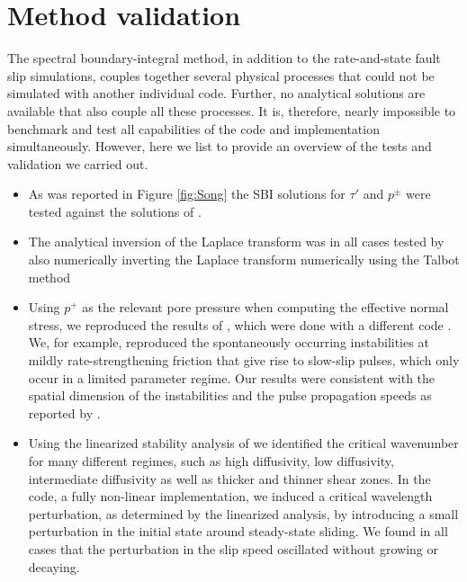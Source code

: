 \documentclass[draft]{agujournal2019}
\begin{document}
\section{Method validation}

The spectral boundary-integral method, in addition to the rate-and-state fault slip simulations, couples together several physical processes that could not be simulated with another individual code. Further, no analytical solutions are available that also couple all these processes. It is, therefore, nearly impossible to benchmark and test all capabilities of the code and implementation simultaneously. However, here we list to provide an overview of the tests and validation we carried out.

\begin{itemize}
    \item As was reported in Figure \ref{fig:Song} the SBI solutions for $\tau'$ and $p^\pm$ were tested against the solutions of \cite{Song2017}.
    \item The analytical inversion of the Laplace transform was in all cases tested by also numerically inverting the Laplace transform numerically using the Talbot method \cite{Talbot1979}
    \item Using $p^+$ as the relevant pore pressure when computing the effective normal stress, we reproduced the results of \cite{Heimisson2019}, which were done with a different code \cite{Torberntsson2018}. We, for example, reproduced the spontaneously occurring instabilities at mildly rate-strengthening friction that give rise to slow-slip pulses, which only occur in a limited parameter regime. Our results were consistent with the spatial dimension of the instabilities and the pulse propagation speeds as reported by \cite{Heimisson2019}.
    \item Using the linearized stability analysis of \cite{Heimisson2021} we identified the critical wavenumber for many different regimes, such as high diffusivity, low diffusivity, intermediate diffusivity as well as thicker and thinner shear zones. In the code, a fully non-linear implementation, we induced a critical wavelength perturbation, as determined by the linearized analysis, by introducing a small perturbation in the initial state around steady-state sliding. We found in all cases that the perturbation in the slip speed oscillated without growing or decaying.
\end{itemize}
\end{document}

